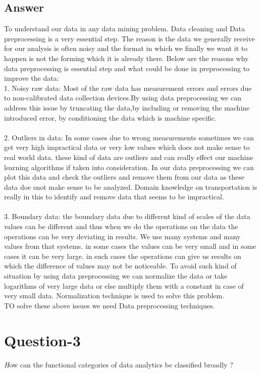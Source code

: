 \documentclass{article}
\begin{document}
\subsection{Answer}
To understand our data in any data mining problem. Data cleaning and Data preprocessing is a very essential step. The reason is the data we generally receive for our analysis is often noisy and the format in which we finally we want it to happen is not the forming which it is already there. Below are the reasons why data preprocessing is essential step and what could be done in preprocessing to improve the data:
\\1. Noisy raw data: Most of the raw data has measurement errors and errors due to non-calibrated data collection devices.By using data preprocessing we can address this issue by truncating the data,by including or removing the machine introduced error, by conditioning the data which is machine specific.
\\
\\2. Outliers in data: In some cases due to wrong measurements sometimes we can get very high impractical data or very low values which does not make sense to real world data. these kind of data are outliers and can really effect our machine learning algorithms if taken into consideration. In our data preprocessing we can plot this data and check the outliers and remove them from our data as these data doe snot make sense to be analyzed. Domain knowledge on transportation is really in this to identify and remove data that seems to be impractical.
\\
\\3. Boundary data: the boundary data due to different kind of scales of the data values can be different and thus when we do the operations on the data the operations can be very deviating in results. We use many systems and many values from that systems. in some cases the values can be very small and in some cases it can be very large. in such cases the operations can give us results on which the difference of values may not be noticeable. To avoid such kind of situation by using data preprocessing we can normalize the data or take logarithms of very large data or else multiply them with a constant in case of very small data. Normalization technique is used to solve this problem.
\\
TO solve these above issues we need Data preprocessing techniques.

\section{Question-3} \textit How can the functional categories of data analytics be classified broadly ?
\end{document}
